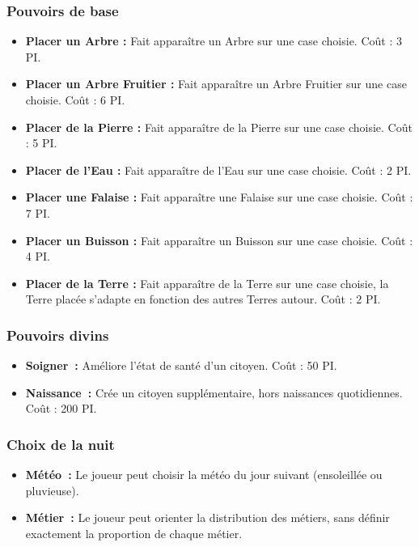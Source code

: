 \documentclass[a4paper]{article}
\begin{document}
      \subsubsection{Pouvoirs de base}
        \begin{itemize} \small
          \item \textbf{Placer un Arbre :} Fait apparaître un Arbre sur une case choisie. Coût : 3 PI.
          \item \textbf{Placer un Arbre Fruitier :} Fait apparaître un Arbre Fruitier sur une case choisie. Coût : 6 PI.
          \item \textbf{Placer de la Pierre :} Fait apparaître de la Pierre sur une case choisie. Coût : 5 PI.
          \item \textbf{Placer de l'Eau :} Fait apparaître de l'Eau sur une case choisie. Coût : 2 PI.
          \item \textbf{Placer une Falaise :} Fait apparaître une Falaise sur une case choisie. Coût : 7 PI.
          \item \textbf{Placer un Buisson :} Fait apparaître un Buisson sur une case choisie. Coût : 4 PI.
          \item \textbf{Placer de la Terre :} Fait apparaître de la Terre sur une case choisie, la Terre placée s'adapte en fonction des autres Terres autour. Coût : 2 PI.
        \end{itemize} \normalsize

      \subsubsection{Pouvoirs divins}
        \begin{itemize} \small
          \item \textbf{Soigner :} Améliore l'état de santé d'un citoyen. Coût : 50 PI.
          \item \textbf{Naissance :} Crée un citoyen supplémentaire, hors naissances quotidiennes. Coût : 200 PI.
        \end{itemize} \normalsize

      \subsubsection{Choix de la nuit}
        \begin{itemize} \small
          \item \textbf{Météo :} Le joueur peut choisir la météo du jour suivant (ensoleillée ou pluvieuse).
          \item \textbf{Métier :} Le joueur peut orienter la distribution des métiers, sans définir exactement la proportion de chaque métier.
        \end{itemize} \normalsize
\end{document}
